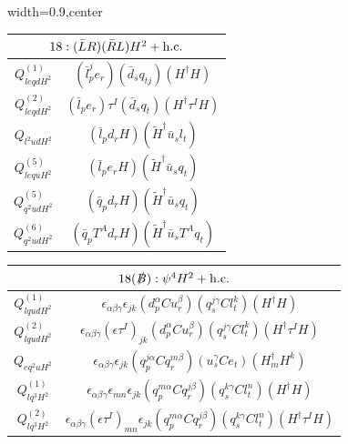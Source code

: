
\begin{table}[H]
\begin{center}
\begin{adjustbox}{width=0.9\textwidth,center}
\small
\begin{minipage}[t]{4.9cm}
\renewcommand{\arraystretch}{1.5}
\begin{tabular}[t]{c|c}
\multicolumn{2}{c}{\boldmath$18:(\bar L R)(\bar R L)H^2 + \mathrm{h.c.}$} \\
\hline
$Q_{leqdH^2}^{(1)}$  &  $(\bar l_p^j e_r) (\bar d_s q_{tj}) (H^\dag H)$ \\
%
$Q_{leqdH^2}^{(2)}$  &  $(\bar l_p e_r) \tau^I (\bar d_s q_t) (H^\dag \tau^I H)$ \\
%
$Q_{l^2udH^2}$  &  $(\bar l_p d_r H) (\widetilde H^\dag \bar u_s l_t)$ \\
%
$Q_{lequH^2}^{(5)}$  &  $(\bar l_p e_r H) (\widetilde H^\dag \bar u_s q_t)$ \\
%
$Q_{q^2udH^2}^{(5)}$  &  $(\bar q_p d_r H) (\widetilde H^\dag \bar u_s q_t)$ \\
%
$Q_{q^2udH^2}^{(6)}$  &  $(\bar q_p T^A d_r H) (\widetilde H^\dag \bar u_s T^A q_t)$
\end{tabular}
\end{minipage}
\hspace{1cm}
\begin{minipage}[t]{7.6cm}
\renewcommand{\arraystretch}{1.5}
\begin{tabular}[t]{c|c}
\multicolumn{2}{c}{\boldmath$18(\slashed B):\psi^4H^2 + \mathrm{h.c.}$} \\
\hline
$Q_{lqudH^2}^{(1)}$  &  $\epsilon_{\alpha\beta\gamma} \epsilon_{jk} (d_p^{\alpha} C u_r^{\beta}) (q_s^{j\gamma} C l_t^k) (H^\dag H)$ \\
%
$Q_{lqudH^2}^{(2)}$  &  $\epsilon_{\alpha\beta\gamma} (\epsilon \tau^I)_{jk} (d_p^{\alpha} C u_r^{\beta}) (q_s^{j\gamma} C l_t^k) (H^\dag \tau^I H)$ \\
%
$Q_{eq^2uH^2}$  &  $\epsilon_{\alpha\beta\gamma} \epsilon_{jk}  (q_p^{j\alpha} C q_r^{m\beta}) (u_s^{\gamma} C e_t) (H^\dag_m H^k)$ \\
%
$Q_{lq^3H^2}^{(1)}$  &  $\epsilon_{\alpha\beta\gamma} \epsilon_{mn} \epsilon_{jk} (q_p^{m\alpha} C q_r^{j\beta}) (q_s^{k\gamma} C l_t^n) (H^\dag H)$ \\
%
$Q_{lq^3H^2}^{(2)}$  &  $\epsilon_{\alpha\beta\gamma} (\epsilon \tau^I)_{mn} \epsilon_{jk} (q_p^{m\alpha} C q_r^{j\beta}) (q_s^{k\gamma} C l_t^n) (H^\dag \tau^I H)$ \\

\end{tabular}
\end{minipage}
\end{adjustbox}
\end{center}
\end{table}
